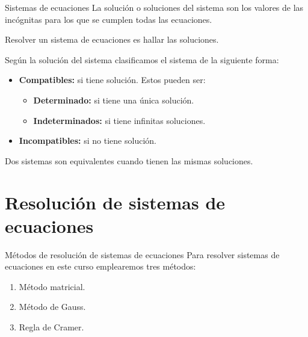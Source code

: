 \documentclass[9pt]{beamer}
\begin{document}
\begin{frame}{Sistemas de ecuaciones}
La solución o soluciones del sistema son los valores de las incógnitas para los que se cumplen todas las ecuaciones.
\pause

Resolver un sistema de ecuaciones es hallar las soluciones.
\pause

Según la solución del sistema clasificamos el sistema de la siguiente forma:
\pause

\begin{itemize}[<+->]
\item  \textbf{Compatibles:} si tiene solución. Estos pueden ser:
\begin{itemize}
\item  \textbf{Determinado:} si tiene una única solución.
\item  \textbf{Indeterminados:} si tiene infinitas soluciones.
\end{itemize}
\item  \textbf{Incompatibles:} si no tiene solución.
\end{itemize}
\pause
Dos sistemas son equivalentes cuando tienen las mismas soluciones.
\end{frame}



\section{Resolución de sistemas de ecuaciones}

\begin{frame}{Métodos de resolución de sistemas de ecuaciones}
Para resolver sistemas de ecuaciones en este curso emplearemos tres métodos:
\pause

\begin{enumerate}[<+->]
\item Método matricial.
\item Método de Gauss.
\item Regla de Cramer.
\end{enumerate}
\end{frame}
\end{document}
